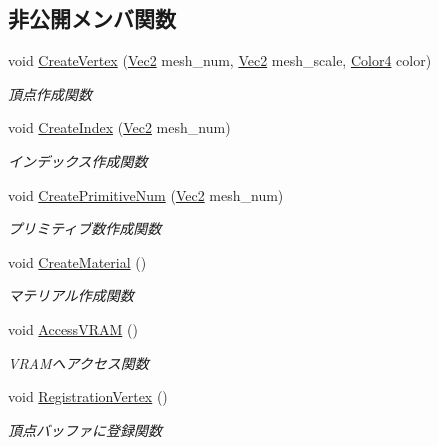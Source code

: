 \subsection*{非公開メンバ関数}
\begin{DoxyCompactItemize}
\item 
void \mbox{\hyperlink{class_mesh_plane_polygon_a50cdb56a3faa5d0bbb8ff75c3dcc2830}{Create\+Vertex}} (\mbox{\hyperlink{_vector3_d_8h_a5ef6e95dfc5f9d3820b71772d99bbc25}{Vec2}} mesh\+\_\+num, \mbox{\hyperlink{_vector3_d_8h_a5ef6e95dfc5f9d3820b71772d99bbc25}{Vec2}} mesh\+\_\+scale, \mbox{\hyperlink{_vector3_d_8h_a9c2339f516cf07ce4753b8a99fab3791}{Color4}} color)
\begin{DoxyCompactList}\small\item\em 頂点作成関数 \end{DoxyCompactList}\item 
void \mbox{\hyperlink{class_mesh_plane_polygon_ae7067eb849977a12554633e604806f85}{Create\+Index}} (\mbox{\hyperlink{_vector3_d_8h_a5ef6e95dfc5f9d3820b71772d99bbc25}{Vec2}} mesh\+\_\+num)
\begin{DoxyCompactList}\small\item\em インデックス作成関数 \end{DoxyCompactList}\item 
void \mbox{\hyperlink{class_mesh_plane_polygon_a0228c78794fe950ccb69b3a77a0239b8}{Create\+Primitive\+Num}} (\mbox{\hyperlink{_vector3_d_8h_a5ef6e95dfc5f9d3820b71772d99bbc25}{Vec2}} mesh\+\_\+num)
\begin{DoxyCompactList}\small\item\em プリミティブ数作成関数 \end{DoxyCompactList}\item 
void \mbox{\hyperlink{class_mesh_plane_polygon_aea5b128def1dae8f391b80be25172b36}{Create\+Material}} ()
\begin{DoxyCompactList}\small\item\em マテリアル作成関数 \end{DoxyCompactList}\item 
void \mbox{\hyperlink{class_mesh_plane_polygon_a30fd785154d01644ba76165673c5a7ac}{Access\+V\+R\+AM}} ()
\begin{DoxyCompactList}\small\item\em V\+R\+A\+Mへアクセス関数 \end{DoxyCompactList}\item 
void \mbox{\hyperlink{class_mesh_plane_polygon_ae3c43c5641c962ac848b3dadd3ea15e5}{Registration\+Vertex}} ()
\begin{DoxyCompactList}\small\item\em 頂点バッファに登録関数 \end{DoxyCompactList}\item 

\end{DoxyCompactItemize}
